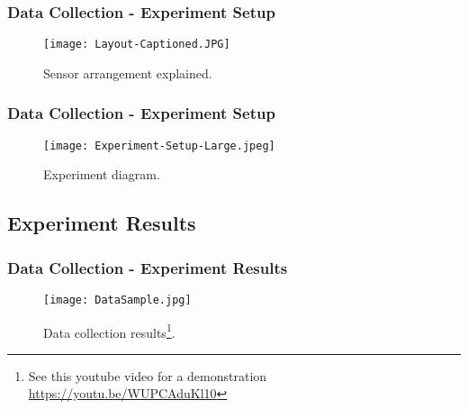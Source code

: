 \begin{frame}

	\frametitle{Data Collection - Experiment Setup}
	
	\begin{figure}[h!]
		\centering
		\texttt{[image: Layout-Captioned.JPG]}
		\caption{Sensor arrangement explained.}
	\end{figure}

\end{frame}


\begin{frame}

	\frametitle{Data Collection - Experiment Setup}
	
	\begin{figure}[h!]
		\centering
		\texttt{[image: Experiment-Setup-Large.jpeg]}
		\caption{Experiment diagram.}
	\end{figure}

\end{frame}


\subsection{Experiment Results}
\begin{frame}

	\frametitle{Data Collection - Experiment Results}
	
	\begin{figure}[h!]
		\centering
		\texttt{[image: DataSample.jpg]}
		\caption{Data collection results\footnote{See this youtube video for a demonstration
\url{https://youtu.be/WUPCAduKl10}}.}
	\end{figure}

\end{frame}




